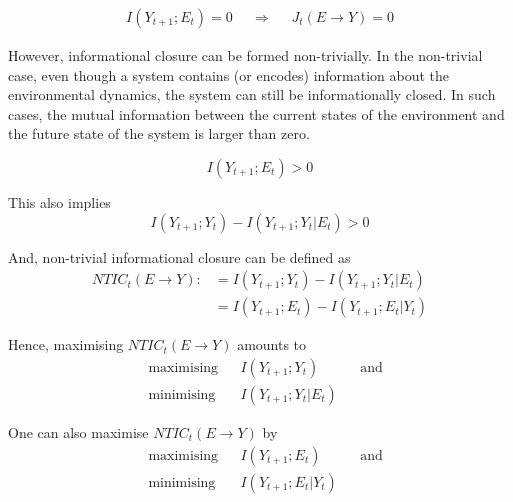 \documentclass[utf8]{article}
\begin{document}
				\begin{equation}
				\begin{aligned}
				{I(Y_{t+1};E_{t})=0}&&{\Rightarrow}&&{J_{t}(E \rightarrow Y )=0}
				\end{aligned}
				\end{equation}


			\noindent
			However, informational closure can be formed non-trivially. In the non-trivial case, even though a system contains (or encodes) information about the environmental dynamics, the system can still be informationally closed. In such cases, the mutual information between the current states of the environment and the future state of the system is larger than zero.

				\begin{equation}
				I(Y_{t+1};E_{t}) > 0
				\end{equation}

			\noindent
			This also implies
				\begin{equation}
					I(Y_{t+1};Y_{t})-I(Y_{t+1};Y_{t}|E_{t}) > 0
				\end{equation}



			\noindent
			And, non-trivial informational closure can be defined as
				\begin{align}
    				NTIC_t(E\rightarrow Y) :&=I(Y_{t+1};Y_{t})-I(Y_{t+1};Y_{t}|E_{t}) 
    				\label{eq:NTIC1}\\
    				&=I(Y_{t+1};E_{t})-I(Y_{t+1};E_{t}|Y_{t}) 
    				\label{eq:NTIC2}
				\end{align}
			

			\noindent
			Hence, maximising $NTIC_t(E\rightarrow Y)$ amounts to
				\begin{equation}
    				\label{eq:nticObjective}
    				\begin{aligned}
    				& \text{maximising} & { } & I(Y_{t+1};Y_{t}) & { } & \text{and} \\
    				& \text{minimising} & { } & I(Y_{t+1};Y_{t}|E_{t}) & { }
    				\end{aligned}
				\end{equation}
			
			\noindent
			One can also maximise $NTIC_t(E\rightarrow Y)$ by 
				\begin{equation}
    				\label{eq:nticObjective2}
    				\begin{aligned}
    				& \text{maximising} & { } & I(Y_{t+1};E_{t}) & { } & \text{and} \\
    				& \text{minimising} & { } & I(Y_{t+1};E_{t}|Y_{t}) & { }
    				\end{aligned}
				\end{equation}			
\end{document}
